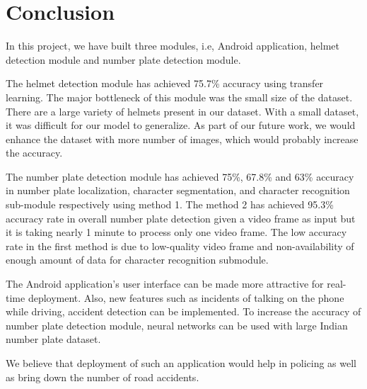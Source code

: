 \chapter{Conclusion}

\par In this project, we have built three modules, i.e, Android application, helmet detection module and number plate detection module. \par The helmet detection module has achieved 75.7\% accuracy using transfer learning. The major bottleneck of this module was the small size of the dataset. There are a large variety of helmets present in our dataset. With a small dataset, it was difficult for our model to generalize. As part of our future work, we would enhance the dataset with more number of images, which would probably increase the accuracy.
\par The number plate detection module has achieved 75\%, 67.8\% and 63\% accuracy in number plate localization, character segmentation, and character recognition sub-module respectively using method 1. The method 2 has achieved 95.3\% accuracy rate in overall number plate detection given a video frame as input but it is taking nearly 1 minute to process only one video frame. The low accuracy rate in the first method is due to low-quality video frame and non-availability of enough amount of data for character recognition submodule.
\par The Android application's user interface can be made more attractive for real-time deployment. Also, new features such as incidents of talking on the phone while driving, accident detection can be implemented. To increase the accuracy of number plate detection module, neural networks can be used with large Indian number plate dataset.  

\par We believe that deployment of such an application would help in policing as well as bring down the number of road accidents.



